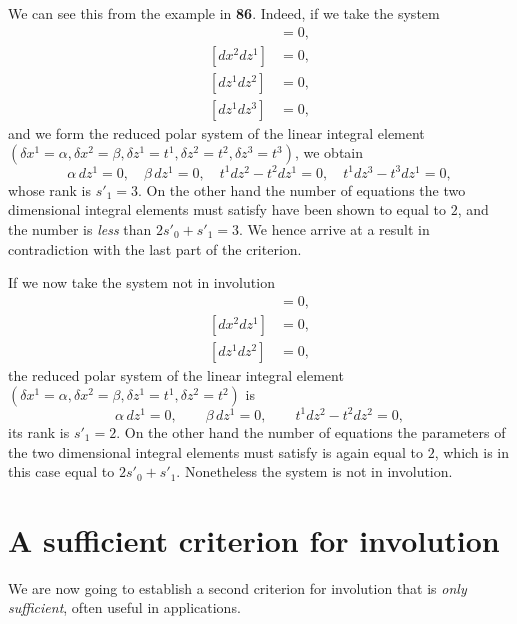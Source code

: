\documentclass[leqno,11pt]{book}
\numberwithin{equation}{chapter}
\theoremstyle{shape1}
\theoremstyle{shape0}
\theoremstyle{shape2}
\theoremstyle{definition}
\begin{document}
We can see this from the example in \textsection\textbf{86}. Indeed, if we take the system
\begin{align*}
  [dx^{1}dz^{1}]&=0,\\
  [dx^{2}dz^{1}]&=0,\\
  [dz^{1}dz^{2}]&=0,\\
  [dz^{1}dz^{3}]&=0,
\end{align*}
and we form the reduced polar system of the linear integral element $(\delta x^{1}=\alpha,\delta x^{2}=\beta,\delta z^{1}=t^{1},\delta z^{2}=t^{2},\delta z^{3}=t^{3})$, we obtain
\[
\alpha\,dz^{1}=0,\quad \beta\,dz^{1}=0,\quad t^{1}dz^{2}-t^{2}dz^{1}=0,\quad t^{1}dz^{3}-t^{3}dz^{1}=0,
\]
whose rank is $s'_{1}=3$. On the other hand the number of equations the two dimensional integral elements must satisfy have been shown to equal to $2$, and the number is \emph{less} than $2s'_{0}+s'_{1}=3$. We hence arrive at a result in contradiction with the last part of the criterion.

If we now take the system not in involution
\begin{align*}
  [dx^{1}dz^{1}]&=0,\\
  [dx^{2}dz^{1}]&=0,\\
  [dz^{1}dz^{2}]&=0,  
\end{align*}
the reduced polar system of the linear integral element $(\delta x^{1}=\alpha,\delta x^{2}=\beta,\delta z^{1}=t^{1},\delta z^{2}=t^{2})$ is
\[
\alpha\, dz^{1}=0,\qquad \beta\, dz^{1}=0,\qquad t^{1}dz^{2}-t^{2}dz^{2}=0,
\]
its rank is $s'_{1}=2$. On the other hand the number of equations the parameters of the two dimensional integral elements must satisfy is again equal to $2$, which is in this case equal to $2s'_{0}+s'_{1}$. Nonetheless the system is not in involution.


\section{A sufficient criterion for involution}
\label{sec:suff-crit-invol}

\fsec We are now going to establish a second criterion for involution that is \emph{only sufficient}, often useful in applications.
\end{document}
